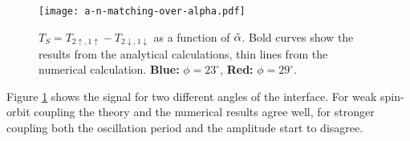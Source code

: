 \begin{figure}
    \begin{center}
        \texttt{[image: a-n-matching-over-alpha.pdf]}
    \end{center}
    \caption{$T_S = T_{2\uparrow,1\uparrow} - T_{2\downarrow,1\downarrow}$ as
        a function of $\tilde \alpha$. Bold curves show the results from the analytical
        calculations, thin lines from the numerical calculation.
        \textbf{Blue:} $\phi = 23^\circ$, \textbf{Red:} $\phi = 29^\circ$.
    }
    \label{fig:a-n-matching-alpha}
\end{figure}

Figure \ref{fig:a-n-matching-alpha} shows the signal for two different
angles of the interface. For weak spin-orbit coupling the theory and the
numerical results agree well, for stronger coupling both the oscillation
period and the amplitude start to disagree.


